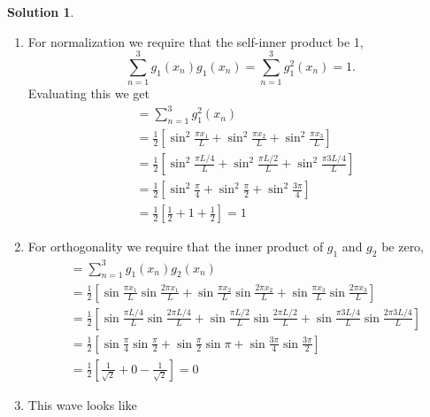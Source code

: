 \documentclass[10pt]{article}
\theoremstyle{definition}
\newtheorem{soln}{Solution}
\begin{document}
\begin{soln}~
  \begin{enumerate}[label=(\alph*)]
    \item For normalization we require that the self-inner product be 1,
          $$\sum_{n=1}^{3}g_1(x_n)g_1(x_n)=\sum_{n=1}^{3}g_1^2(x_n)=1.$$
          Evaluating this we get
          \begin{align*}
             & =\sum_{n=1}^{3}g_1^2(x_n)                                                                         \\
             & =\frac{1}{2}\left[\sin^2\frac{\pi x_1}{L}+\sin^2\frac{\pi x_2}{L}+\sin^2\frac{\pi x_3}{L}\right]  \\
             & =\frac{1}{2}\left[\sin^2\frac{\pi L/4}{L}+\sin^2\frac{\pi L/2}{L}+\sin^2\frac{\pi 3L/4}{L}\right] \\
             & =\frac{1}{2}\left[\sin^2\frac{\pi}{4}+\sin^2\frac{\pi}{2}+\sin^2\frac{3\pi}{4}\right]             \\
             & =\frac{1}{2}\left[\frac{1}{2}+1+\frac{1}{2}\right]=1
          \end{align*}
    \item For orthogonality we require that the inner product of $g_1$ and $g_2$ be zero,
          \begin{align*}
             & =\sum_{n=1}^{3}g_1(x_n)g_2(x_n)                               \\
             & =\frac{1}{2}\left[\sin\frac{\pi x_1}{L}\sin\frac{2\pi x_1}{L}
              +\sin\frac{\pi x_2}{L}\sin\frac{2\pi x_2}{L}
              +\sin\frac{\pi x_3}{L}\sin\frac{2\pi x_3}{L}
            \right]                                                          \\
             & =\frac{1}{2}\left[\sin\frac{\pi L/4}{L}\sin\frac{2\pi L/4}{L}
              +\sin\frac{\pi L/2}{L}\sin\frac{2\pi L/2}{L}
              +\sin\frac{\pi 3L/4}{L}\sin\frac{2\pi 3L/4}{L}
            \right]                                                          \\
             & =\frac{1}{2}\left[\sin\frac{\pi}{4}\sin\frac{\pi}{2}
              +\sin\frac{\pi}{2}\sin\pi
              +\sin\frac{3\pi}{4}\sin\frac{3\pi}{2}
            \right]                                                          \\
             & =\frac{1}{2}\left[\frac{1}{\sqrt{2}}
              +0
              -\frac{1}{\sqrt{2}}
              \right]=0
          \end{align*}
    \item This wave looks like

\end{enumerate}
\end{soln}
\end{document}
